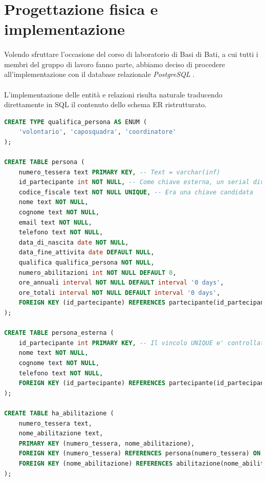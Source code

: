 \documentclass[12pt,a4paper,twoside,english,italian]{book}
\begin{document}
\section{Progettazione fisica e implementazione}

\paragraph{} Volendo sfruttare l'occasione del corso di laboratorio di Basi di Bati, a cui tutti i membri del gruppo di lavoro fanno parte, abbiamo deciso di procedere all'implementazione con il database relazionale \emph{PostgreSQL} \cite{postgre}. 

\paragraph{} L'implementazione delle entità e relazioni risulta naturale traducendo direttamente in SQL il contenuto dello schema ER ristrutturato. 

\begin{lstlisting}[language=SQL, caption=Esempio di implementazione di entità e relazioni]
CREATE TYPE qualifica_persona AS ENUM (
    'volontario', 'caposquadra', 'coordinatore'
);

CREATE TABLE persona (
    numero_tessera text PRIMARY KEY, -- Text = varchar(inf)
    id_partecipante int NOT NULL, -- Come chiave esterna, un serial diventa int | Il vincolo UNIQUE e' controllato dal trigger apposito
    codice_fiscale text NOT NULL UNIQUE, -- Era una chiave candidata
    nome text NOT NULL,
    cognome text NOT NULL,
    email text NOT NULL,
    telefono text NOT NULL,
    data_di_nascita date NOT NULL,
    data_fine_attivita date DEFAULT NULL,
    qualifica qualifica_persona NOT NULL,
    numero_abilitazioni int NOT NULL DEFAULT 0,
    ore_annuali interval NOT NULL DEFAULT interval '0 days',
    ore_totali interval NOT NULL DEFAULT interval '0 days',
    FOREIGN KEY (id_partecipante) REFERENCES partecipante(id_partecipante) ON DELETE NO ACTION ON UPDATE CASCADE
);

CREATE TABLE persona_esterna (
    id_partecipante int PRIMARY KEY, -- Il vincolo UNIQUE e' controllato dal trigger apposito
    nome text NOT NULL,
    cognome text NOT NULL,
    telefono text NOT NULL,
    FOREIGN KEY (id_partecipante) REFERENCES partecipante(id_partecipante) ON DELETE NO ACTION ON UPDATE CASCADE
);

CREATE TABLE ha_abilitazione (
    numero_tessera text,
    nome_abilitazione text,
    PRIMARY KEY (numero_tessera, nome_abilitazione),
    FOREIGN KEY (numero_tessera) REFERENCES persona(numero_tessera) ON DELETE CASCADE ON UPDATE CASCADE,
    FOREIGN KEY (nome_abilitazione) REFERENCES abilitazione(nome_abilitazione) ON DELETE CASCADE ON UPDATE CASCADE
);
\end{lstlisting}
\end{document}
